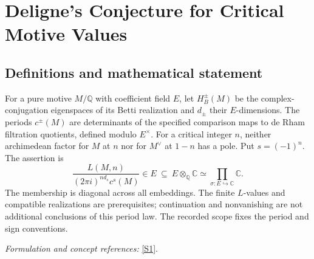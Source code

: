 \documentclass[11pt,a4paper]{article}
\numberwithin{equation}{section}
\newcommand{\Q}{\mathbb{Q}}
\newcommand{\C}{\mathbb{C}}
\newcommand{\sref}[2]{\hyperlink{source:#1:#2}{[S#2]}}
\newif\ifshowcatalogue
\newcommand{\cataloguescope}[1]{\ifshowcatalogue
 \paragraph{Exact scope in the supplied catalogue.}
 \begin{quote}\small #1\end{quote}\fi}
\begin{document}
\setcounter{section}{0}
\section*{\texorpdfstring{Deligne's Conjecture for Critical Motive Values}{Deligne's Conjecture for Critical Motive Values}}\label{statement}
\subsection{Definitions and mathematical statement}
For a pure motive $M/\Q$ with coefficient field $E$, let $H_B^\pm(M)$ be the complex-conjugation eigenspaces of its Betti realization and $d_\pm$ their $E$-dimensions. The periods $c^\pm(M)$ are determinants of the specified comparison maps to de Rham filtration quotients, defined modulo $E^\times$. For a critical integer $n$, neither archimedean factor for $M$ at $n$ nor for $M^\vee$ at $1-n$ has a pole. Put $s=(-1)^n$. The assertion is
\[
 \frac{L(M,n)}{(2\pi i)^{n d_s}c^s(M)}\in E
 \ \subseteq\ E\otimes_{\Q}\C\simeq\prod_{\sigma:E\hookrightarrow\C}\C.
\]
The membership is diagonal across all embeddings. The finite $L$-values and compatible realizations are prerequisites; continuation and nonvanishing are not additional conclusions of this period law. The recorded scope fixes the period and sign conventions.
\par\smallskip\textit{Formulation and concept references:} \sref{statement}{1}.
\cataloguescope{For every pure motive M over Q with coefficients in a number field E, in Deligne's geometric realization formalism (Betti, de Rham and compatible l-adic realizations with comparison, dual, tensor and Tate-twist structures), and every critical integer n, the normalized finite L-value vector L(M,n)/((2*pi*i)\textasciicircum{}(n*d\_sign)*c\textasciicircum{}sign(M)) lies in the diagonal E inside E tensor C, where sign=(-1)\textasciicircum{}n and d\_sign=dim\_E H\_B\textasciicircum{}sign(M). Here H\_B\textasciicircum{}sign is the sign eigenspace of complex conjugation, and c\textasciicircum{}sign is the determinant of the Betti/de Rham comparison to the corresponding filtration quotient, computed in E-rational bases and defined modulo E-units as in Deligne1.7/2.6. Critical means that L\_infinity(sigma,M,s) and L\_infinity(sigma,Mdual,1-s) have no pole at s=n for every embedding sigma:E->C (equivalently use Mdual(1) at -s). Use finite, not completed, L-functions with the compatible E-valued local factors of2.2. Analytic continuation giving finite values at the selected critical integer and the source's well-defined compatible realizations/local factors are defining prerequisites, not assertions proved by this period law and not a restriction to cases whose continuation is already known. The simultaneous embedding vector must come from one element of E; unrelated componentwise algebraicity is insufficient. All-zero values are allowed, but mixed zero/nonzero components do not satisfy the diagonal membership. No general nonvanishing or order-of-zero assertion from Deligne2.7 is appended.}
\end{document}
